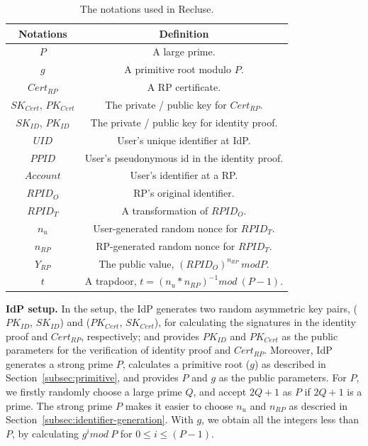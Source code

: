 \begin{table}[tb]
    \caption{The notations used in Recluse.}
    \centering
    \begin{tabular}{|c|c|}
    \hline
    {Notations} & {Definition} \\
    \hline
    {$P$} & {A large prime.} \\
    \hline
    {$g$} & {A primitive root  modulo $P$.} \\
    \hline
    {$Cert_{RP}$} & {A RP certificate.} \\
    \hline
    {$SK_{Cert}$, $PK_{Cert}$} & {The private / public key for $Cert_{RP}$.} \\
    \hline
    {$SK_{ID}$, $PK_{ID}$} & {The private / public key for  identity proof.} \\
    \hline
    {$UID$} & {User's unique identifier at IdP.} \\
    \hline
    {$PPID$} & {User's pseudonymous id in the identity proof.} \\
    \hline
    {$Account$} & {User's identifier at a RP.} \\
    \hline
    {$RPID_O$} & {RP's original identifier.} \\
    \hline
    {$RPID_T$} & {A transformation of $RPID_O$.} \\
    \hline
    {$n_u$} & {User-generated random nonce for $RPID_T$. } \\
    \hline
    {$n_{RP}$} & {RP-generated random nonce for $RPID_T$. } \\
    \hline
    {$Y_{RP}$} & {The public value, $(RPID_O)^{n_{RP}} \ mod P$. } \\
    \hline
    {$t$} & {A trapdoor, $t=(n_u*n_{RP})^{-1} mod \ (P-1)$. } \\
    \hline
    \end{tabular}
    \label{tbl:notations}
\end{table}

\noindent\textbf{IdP setup.} In the setup, the IdP generates two random asymmetric key pairs, ($PK_{ID}$, $SK_{ID}$) and ($PK_{Cert}$, $SK_{Cert}$), for calculating the signatures in the identity proof and $Cert_{RP}$, respectively; and provides $PK_{ID}$ and $PK_{Cert}$ as the public parameters for the verification of identity proof and $Cert_{RP}$. Moreover, IdP generates a strong prime $P$, calculates  a primitive root ($g$) as described in Section~\ref{subsec:primitive}, and provides $P$ and $g$ as the public parameters. For $P$, we firstly randomly choose a large prime $Q$, and accept  $2Q+1$ as $P$ if $2Q+1$ is a prime. The strong prime $P$ makes it easier to choose $n_{u}$ and $n_{RP}$ as descried in Section~\ref{subsec:identifier-generation}. With $g$, we obtain all the integers less than $P$, by calculating $g^i mod \ P$ for $0 \leq i \leq (P-1)$.

